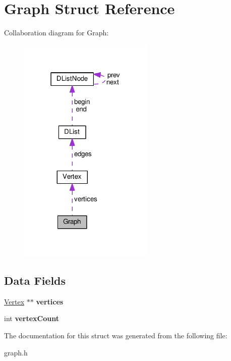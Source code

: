 \hypertarget{struct_graph}{}\section{Graph Struct Reference}
\label{struct_graph}


Collaboration diagram for Graph\+:
\nopagebreak
\begin{figure}[H]
\begin{center}
\leavevmode
\includegraphics[width=183pt]{struct_graph__coll__graph}
\end{center}
\end{figure}
\subsection*{Data Fields}
\begin{DoxyCompactItemize}
\item 
\hyperlink{struct_vertex}{Vertex} $\ast$$\ast$ {\bfseries vertices}\hypertarget{struct_graph_ae4a52fdfb3fa5a3e8f680619298d1bad}{}\label{struct_graph_ae4a52fdfb3fa5a3e8f680619298d1bad}

\item 
int {\bfseries vertex\+Count}\hypertarget{struct_graph_a02ef9e95c4651c7efdb3a39e29078571}{}\label{struct_graph_a02ef9e95c4651c7efdb3a39e29078571}

\end{DoxyCompactItemize}


The documentation for this struct was generated from the following file\+:\begin{DoxyCompactItemize}
\item 
graph.\+h\end{DoxyCompactItemize}
